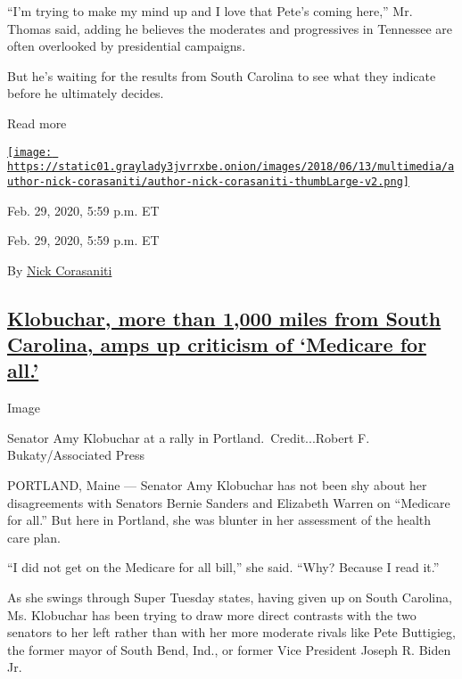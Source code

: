 ``I'm trying to make my mind up and I love that Pete's coming here,''
Mr. Thomas said, adding he believes the moderates and progressives in
Tennessee are often overlooked by presidential campaigns.

But he's waiting for the results from South Carolina to see what they
indicate before he ultimately decides.

Read more

\href{https://www.nytimes3xbfgragh.onion/by/nick-corasaniti}{\texttt{[image: https://static01.graylady3jvrrxbe.onion/images/2018/06/13/multimedia/author-nick-corasaniti/author-nick-corasaniti-thumbLarge-v2.png]}}

Feb. 29, 2020, 5:59 p.m. ET

Feb. 29, 2020, 5:59 p.m. ET

By \href{https://www.nytimes3xbfgragh.onion/by/nick-corasaniti}{Nick
Corasaniti}

\hypertarget{klobuchar-more-than-1000-miles-from-south-carolina-amps-up-criticism-of-medicare-for-all}{%
\subsection{\texorpdfstring{\protect\hyperlink{klobuchar-more-than-1000-miles-from-south-carolina-amps-up-criticism-of-medicare-for-all}{Klobuchar,
more than 1,000 miles from South Carolina, amps up criticism of
`Medicare for
all.'}}{Klobuchar, more than 1,000 miles from South Carolina, amps up criticism of `Medicare for all.'}}\label{klobuchar-more-than-1000-miles-from-south-carolina-amps-up-criticism-of-medicare-for-all}}

Image

Senator Amy Klobuchar at a rally in Portland.~Credit...Robert F.
Bukaty/Associated Press

PORTLAND, Maine --- Senator Amy Klobuchar has not been shy about her
disagreements with Senators Bernie Sanders and Elizabeth Warren on
``Medicare for all.'' But here in Portland, she was blunter in her
assessment of the health care plan.

``I did not get on the Medicare for all bill,'' she said. ``Why? Because
I read it.''

As she swings through Super Tuesday states, having given up on South
Carolina, Ms. Klobuchar has been trying to draw more direct contrasts
with the two senators to her left rather than with her more moderate
rivals like Pete Buttigieg, the former mayor of South Bend, Ind., or
former Vice President Joseph R. Biden Jr.

